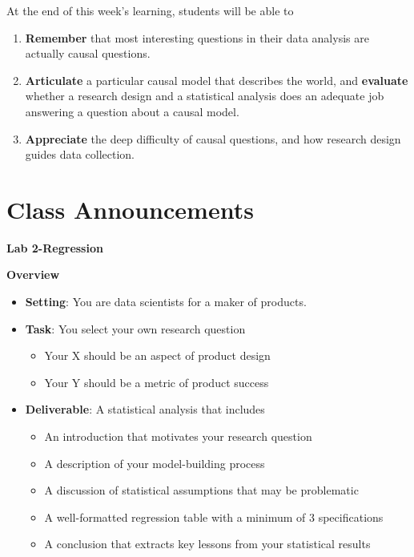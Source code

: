 \documentclass[
]{book}
\providecommand{\tightlist}{%
  \setlength{\itemsep}{0pt}\setlength{\parskip}{0pt}}
\theoremstyle{definition}
\theoremstyle{definition}
\theoremstyle{definition}
\theoremstyle{definition}
\theoremstyle{remark}
\begin{document}
At the end of this week's learning, students will be able to

\begin{enumerate}
\def\labelenumi{\arabic{enumi}.}
\tightlist
\item
  \textbf{Remember} that most interesting questions in their data analysis are actually causal questions.
\item
  \textbf{Articulate} a particular causal model that describes the world, and \textbf{evaluate} whether a research design and a statistical analysis does an adequate job answering a question about a causal model.
\item
  \textbf{Appreciate} the deep difficulty of causal questions, and how research design guides data collection.
\end{enumerate}

\hypertarget{class-announcements-9}{%
\section{Class Announcements}\label{class-announcements-9}}

\textbf{Lab 2-Regression}

\textbf{Overview}

\begin{itemize}
\tightlist
\item
  \textbf{Setting}: You are data scientists for a maker of products.
\item
  \textbf{Task}: You select your own research question

  \begin{itemize}
  \tightlist
  \item
    Your X should be an aspect of product design
  \item
    Your Y should be a metric of product success
  \end{itemize}
\item
  \textbf{Deliverable}: A statistical analysis that includes

  \begin{itemize}
  \tightlist
  \item
    An introduction that motivates your research question
  \item
    A description of your model-building process
  \item
    A discussion of statistical assumptions that may be problematic
  \item
    A well-formatted regression table with a minimum of 3 specifications
  \item
    A conclusion that extracts key lessons from your statistical results
  \end{itemize}
\end{itemize}
\end{document}
